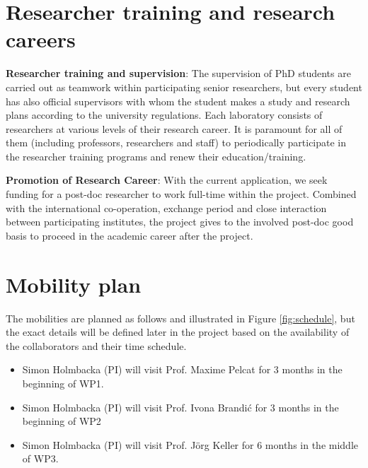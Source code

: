 \documentclass{article}
\begin{document}
\section{Researcher training and research careers}
\textbf{Researcher training and supervision}: The supervision of PhD students are carried out as teamwork within participating senior researchers, 
but every student has also official supervisors with whom the student makes a study and research plans according to the university regulations. 
Each laboratory consists of researchers at various levels of their research career. 
It is paramount for all of them (including professors, researchers and staff) to periodically participate in the researcher training programs and renew their education/training.\smallskip

\textbf{Promotion of Research Career}: With the current application, we seek funding for a post-doc researcher to work full-time within the project. 
Combined with the international co-operation, exchange period and close interaction between participating institutes, the project gives to the involved post-doc good basis to proceed in the academic career after the project.

\section{Mobility plan}
The mobilities are planned as follows and illustrated in Figure \ref{fig:schedule}, but the exact details will be defined later in the project based on the availability of the collaborators and their time schedule.
\begin{itemize}
 \item Simon Holmbacka (PI) will visit Prof. Maxime Pelcat for 3 months in the beginning of WP1. \vspace{-0.3cm}
 \item Simon Holmbacka (PI) will visit Prof. Ivona Brandi\'{c} for 3 months in the beginning of WP2 \vspace{-0.3cm}
 \item Simon Holmbacka (PI) will visit Prof. J\"{o}rg Keller for 6 months in the middle of WP3. \vspace{-0.3cm}
\end{itemize}
\end{document}

